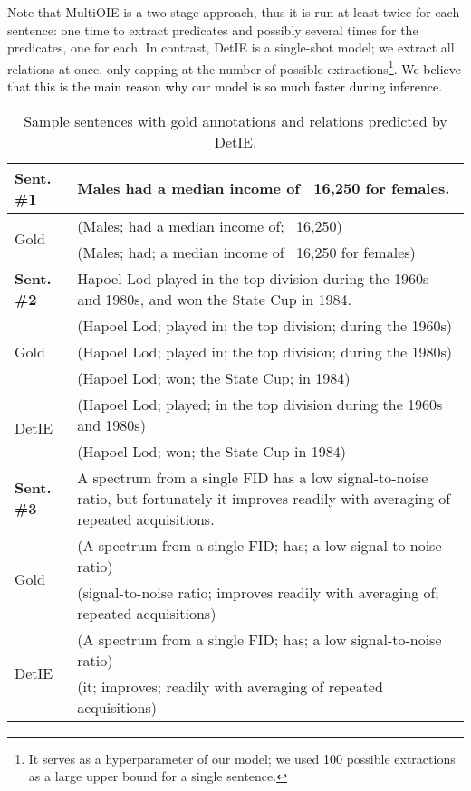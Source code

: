 \documentclass[letterpaper]{article} \usepackage{aaai22}  \usepackage{times}  \usepackage{helvet}  \usepackage{courier}  \usepackage[hyphens]{url}  \usepackage{graphicx} \usepackage{placeins}
\newcommand{\added}[1]{\textcolor{black}{#1}}
\newcommand{\camera}[1]{\textcolor{black}{#1}}
\begin{document}
Note that MultiOIE is a two-stage approach, thus it is run at least twice for each sentence: one time to extract predicates and possibly several times for the predicates, one for each. In contrast, DetIE is a single-shot model; we extract all relations at once, only capping at the number of possible extractions\footnote{It serves as a hyperparameter of our model; we used \camera{100} possible extractions as a large upper bound for a single sentence.}. \added{We believe that this is the main reason why our model is so much faster during inference.}


\begin{table}[!t]\footnotesize\setlength{\tabcolsep}{1pt}
\begin{tabular}{|p{.1\linewidth}|p{.87\linewidth}|}
\hline
\textbf{Sent. \#1} & Males had a median income of \ 16,250 for females. \\ \hline
\multirow{2}{*}{Gold} & (Males; had a median income of; \ 16,250) \\  \hline
DetIE & (Males; had; a median income of \ 16,250 for females) \\ \hline  \hline
\textbf{Sent. \#2} & Hapoel Lod played in the top division during the 1960s and 1980s, and won the State Cup in 1984. \\ \hline
\multirow{3}{*}{Gold} & (Hapoel Lod; played in; the top division; during the 1960s) \\
& (Hapoel Lod; played in; the top division; during the 1980s) \\
& (Hapoel Lod; won; the State Cup; in 1984) \\ \hline
\multirow{2}{*}{DetIE} & (Hapoel Lod; played; in the top division during the 1960s and 1980s) \\ 
&  (Hapoel Lod; won; the State Cup in 1984) \\ \hline  \hline
\textbf{Sent. \#3} & A spectrum from a single FID has a low signal-to-noise ratio, but fortunately it improves readily with averaging of repeated acquisitions. \\ \hline
\multirow{2}{*}{Gold} & (A spectrum from a single FID; has; a low signal-to-noise ratio) \\ 
& (signal-to-noise ratio; improves readily with averaging of; repeated acquisitions) \\  \hline
\multirow{2}{*}{DetIE} & (A spectrum from a single FID; has; a low signal-to-noise ratio) \\
 & (it; improves; readily with averaging of repeated acquisitions) \\ \hline \hline 
 
\end{tabular}
\caption{Sample sentences with gold annotations and relations predicted by DetIE.
}\label{tab:errors}
\end{table}
\end{document}
